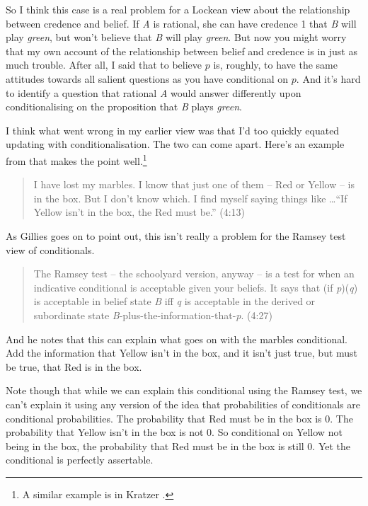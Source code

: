So I think this case is a real problem for a Lockean view about the relationship between credence and belief. If \textit{A} is rational, she can have credence 1 that \textit{B} will play \textit{green}, but won't believe that \textit{B} will play \textit{green}. But now you might worry that my own account of the relationship between belief and credence is in just as much trouble. After all, I said that to believe $p$ is, roughly, to have the same attitudes towards all salient questions as you have conditional on $p$. And it's hard to identify a question that rational \textit{A} would answer differently upon conditionalising on the proposition that \textit{B} plays \textit{green}.

I think what went wrong in my earlier view was that I'd too quickly equated updating with conditionalisation. The two can come apart. Here's an example from \citet{Gillies2010} that makes the point well.\footnote{A similar example is in Kratzer \citeyearpar[94]{Kratzer2012}.}

\begin{quote}I have lost my marbles. I know that just one of them -- Red or Yellow -- is in the box. But I don't know which. I find myself saying things like \dots ``If Yellow isn't in the box, the Red must be.'' (4:13)
\end{quote}
As Gillies goes on to point out, this isn't really a problem for the Ramsey test view of conditionals.
\begin{quote}
The Ramsey test -- the schoolyard version, anyway -- is a test for when an indicative conditional is acceptable given your beliefs. It says that (if \textit{p})(\textit{q}) is acceptable in belief state \textit{B} iff \textit{q} is acceptable in the derived or subordinate state \textit{B}-plus-the-information-that-\textit{p}. (4:27)
\end{quote}
And he notes that this can explain what goes on with the marbles conditional. Add the information that Yellow isn't in the box, and it isn't just true, but must be true, that Red is in the box.

Note though that while we can explain this conditional using the Ramsey test, we can't explain it using any version of the idea that probabilities of conditionals are conditional probabilities. The probability that Red must be in the box is 0. The probability that Yellow isn't in the box is not 0. So conditional on Yellow not being in the box, the probability that Red must be in the box is still 0. Yet the conditional is perfectly assertable.

